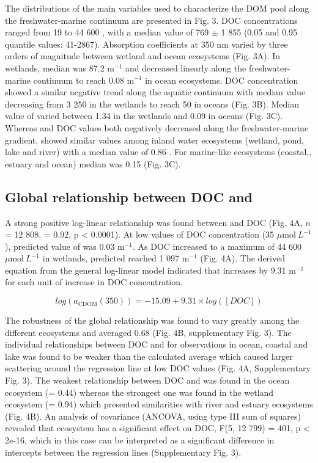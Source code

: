 The distributions of the main variables used to characterize the DOM pool along the freshwater-marine continuum are presented in Fig. 3. DOC concentrations ranged from 19 to 44 600 \mmol, with a median value of 769 $\pm$ 1 855 \mmol (0.05 and 0.95 quantile values: 41-2867). Absorption coefficients at 350 nm varied by three orders of magnitude between wetland and ocean ecosystems (Fig. 3A). In wetlands, median  was 87.2 m$^{-1}$ and decreased linearly along the freshwater-marine continuum to reach 0.08 m$^{-1}$ in ocean ecosystems. DOC concentration showed a similar negative trend along the aquatic continuum with median value decreasing from 3 250 \mmol in the wetlands to reach 50 \mmol in oceans (Fig. 3B). Median value of  varied between 1.34 \suvagram in the wetlands and 0.09 \suvagram in oceans (Fig. 3C). Whereas  and DOC values both negatively decreased along the freshwater-marine gradient,  showed similar values among inland water ecosystems (wetland, pond, lake and river) with a median value of 0.86 \suvagram. For marine-like ecosystems (coastal,, estuary and ocean) median  was 0.15 \suvagram (Fig. 3C).

\subsection*{Global relationship between DOC and }

A strong positive log-linear relationship was found between  and DOC (Fig. 4A, $n$ = 12 808, \rr = 0.92, p < 0.0001). At low values of DOC concentration (35 $\mu\text{mol}~L^{-1}$), predicted value of  was 0.03 m$^{-1}$. As DOC increased to a maximum of 44 600 $\mu\text{mol}~L^{-1}$ in wetlands, predicted  reached 1 097 m$^{-1}$ (Fig. 4A). The derived equation from the general log-linear model indicated that  increases by 9.31 m$^{-1}$ for each unit of increase in DOC concentration.

\begin{equation}
  log(a_{\text{CDOM}}(350)) = -15.09 + 9.31 \times log([DOC])
\end{equation}

The robustness of the global relationship was found to vary greatly among the different ecosystems and \rr averaged 0.68 (Fig. 4B, supplementary Fig. 3). The individual relationships between DOC and  for observations in ocean, coastal and lake was found to be weaker than the calculated average which caused larger scattering around the regression line at low DOC values (Fig. 4A, Supplementary Fig. 3). The weakest relationship between DOC and  was found in the ocean ecosystem (\rr = 0.44) whereas the strongest one was found in the wetland ecosystem (\rr = 0.94) which presented similarities with river and estuary ecosystems (Fig. 4B). An analysis of covariance (ANCOVA, using type III sum of squares) revealed that ecosystem has a significant effect on DOC, F(5, 12 799) = 401, p < 2e-16, which in this case can be interpreted as a significant difference in intercepts between the regression lines (Supplementary Fig. 3).

